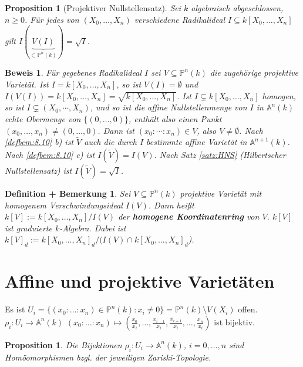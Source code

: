 \documentclass[a4paper,12pt]{report}
\theoremstyle{break}
\newtheorem{DefBem}[Def]{Definition + Bemerkung}
\newtheorem{Prop}[Def]{Proposition}
\theoremstyle{nonumberbreak}
\theoremstyle{nonumberplain}
\newtheorem{Bew}{Beweis}
\newcommand{\emp}[1]{\textbf{\emph{#1}}}
\newcommand{\begriff}[1]{{\index{#1}}\emp{#1}}
\begin{document}
\begin{Prop}[Projektiver Nullstellensatz]
\label{prop:8.9}
 Sei $k$ algebraisch abgeschlossen, $n \ge 0$. Für jedes von $(X_0, \dots, X_n)$ verschiedene Radikalideal $I \subseteq k[X_0,\dots,X_n]$ gilt $I(\underbrace{V(I)}_{\subset \mathbb P^n(k)})=\sqrt{I}$.
\end{Prop}
\begin{Bew}
Für gegebenes Radikalideal $I$ sei $V \subseteq \mathbb P^n(k)$ die zugehörige projektive Varietät. Ist $I = k[X_0, \dots, X_n]$, so ist $V(I) = \emptyset$ und $I(V(I))=k[X_0, \dots, X_n] = \sqrt{k[X_0, \dots, X_n]}$. Ist $I \subsetneq k[X_0, \dots, X_n]$ homogen, so ist $I\subsetneq (X_0,\cdots,X_n)$, und so ist die affine Nullstellenmenge von $I$ in $\mathbb A^n(k)$ echte Obermenge von $\{(0,\dots, 0)\}$, enthält also einen Punkt $(x_0, \dots, x_n) \ne (0, \dots, 0)$. Dann ist $(x_0:\cdots :x_n)\in V$, also $V\ne\emptyset$.
Nach \ref{defbem:8.10} b) ist $\tilde{V}$ auch die durch $I$ bestimmte affine Varietät in $\mathbb A^{n+1}(k)$. Nach \ref{defbem:8.10} c) ist $I(\tilde{V})=I(V)$. Nach Satz \ref{satz:HNS} (Hilbertscher Nullstellensatz) ist $I(\tilde{V})=\sqrt{I}$.  
\end{Bew}
\begin{DefBem}
 \label{defbem:8.11}
Sei $V \subseteq \mathbb P^n(k)$ projektive Varietät mit homogenem Verschwindungsideal $I(V)$. Dann heißt $k[V]:=k[X_0, \dots, X_n]/I(V)$ der \begriff{homogene Koordinatenring} von $V$. $k[V]$ ist graduierte $k$-Algebra. Dabei ist $k[V]_d:=k[X_0, \dots, X_n]_d/(I(V) \cap k[X_0, \dots, X_n]_d$).
\end{DefBem}

\section{Affine und projektive Varietäten}
Es ist $U_i =\{(x_0: \dots: x_n)\in \mathbb P^n(k):x_i \ne 0\}=\mathbb P^n(k) \setminus V(X_i)$ offen.\\
$\rho_i:U_i \rightarrow \mathbb A^n(k)$ $(x_0: \dots: x_n) \mapsto (\frac{x_0}{x_i}, \dots , \frac{x_{i-1}}{x_i},\frac{x_{i+1}}{x_i}, \dots , \frac{x_n}{x_i})$ ist bijektiv.
\begin{Prop}
 \label{prop:9.1}
 Die Bijektionen $\rho_i:U_i \rightarrow \mathbb A^n(k)$, $i = 0, \dots, n$ sind Homöomorphismen bzgl. der jeweiligen Zariski-Topologie.
\end{Prop}


\end{document}
